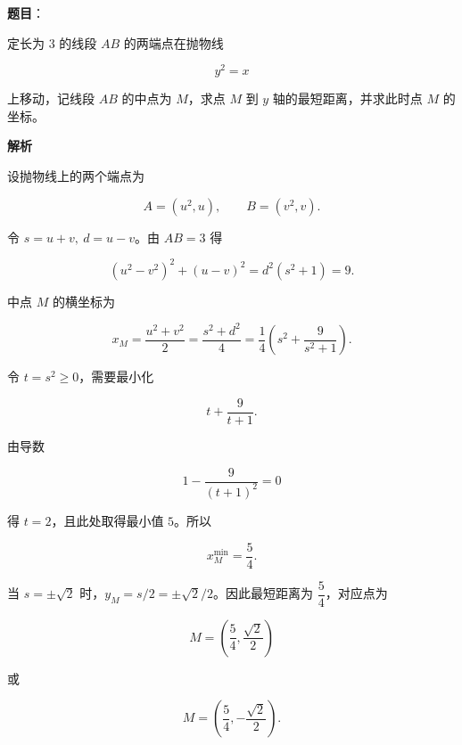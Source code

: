 \begin{answer}

\textbf{题目}：

定长为 $3$ 的线段 $AB$ 的两端点在抛物线

\nopagebreak[4]
\[
y^2=x
\]

上移动，记线段 $AB$ 的中点为 $M$，求点 $M$ 到 $y$ 轴的最短距离，并求此时点 $M$ 的坐标。

\textbf{解析}

设抛物线上的两个端点为

\nopagebreak[4]
\[
A=(u^2,u),\qquad B=(v^2,v).
\]

令 $s=u+v,\ d=u-v$。由 $AB=3$ 得

\nopagebreak[4]
\[
(u^2-v^2)^2+(u-v)^2
=d^2(s^2+1)=9.
\]

中点 $M$ 的横坐标为

\nopagebreak[4]
\[
x_M=\frac{u^2+v^2}{2}
=\frac{s^2+d^2}{4}
=\frac14\left(s^2+\frac9{s^2+1}\right).
\]

令 $t=s^2\ge0$，需要最小化

\nopagebreak[4]
\[
t+\frac9{t+1}.
\]

由导数

\nopagebreak[4]
\[
1-\frac9{(t+1)^2}=0
\]

得 $t=2$，且此处取得最小值 $5$。所以

\nopagebreak[4]
\[
x_M^{\min}=\frac54.
\]

当 $s=\pm\sqrt2$ 时，$y_M=s/2=\pm\sqrt2/2$。因此最短距离为 $\dfrac54$，对应点为

\nopagebreak[4]
\[
M=\left(\frac54,\frac{\sqrt2}{2}\right)
\]

或

\nopagebreak[4]
\[
M=\left(\frac54,-\frac{\sqrt2}{2}\right).
\]


\end{answer}
